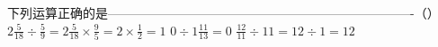 
下列运算正确的是-------------------------------------------------------------------------（\hspace{4em}）
{$2\frac{5}{18} \div \frac{5}{9} = 2\frac{5}{18} \times \frac{9}{5} =2 \times \frac{1}{2}=1$}
{$0 \div 1\frac{11}{13} = 0$}
{$\frac{12}{11} \div 11 = 12 \div 1 = 12$}
